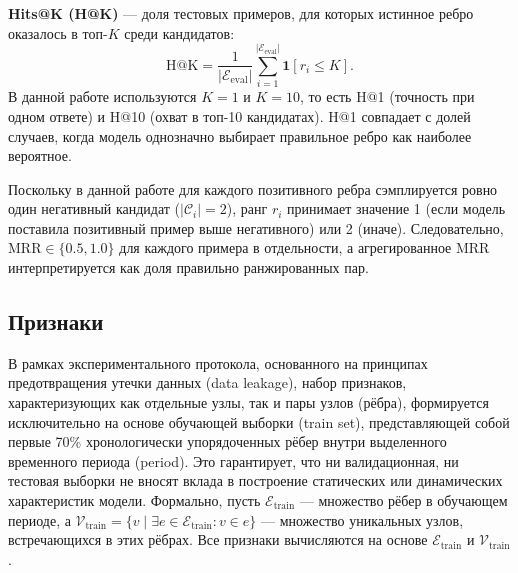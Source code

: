 \documentclass[a4paper,12pt]{extarticle}
\begin{document}
\textbf{Hits@K (H@K)} — доля тестовых примеров, для которых истинное ребро оказалось в топ-$K$ среди кандидатов:
\[
\text{H@K} = \frac{1}{|\mathcal{E}_{\text{eval}}|} \sum_{i=1}^{|\mathcal{E}_{\text{eval}}|} \mathbf{1}[r_i \leq K].
\]
В данной работе используются $K = 1$ и $K = 10$, то есть H@1 (точность при одном ответе) и H@10 (охват в топ-10 кандидатах). H@1 совпадает с долей случаев, когда модель однозначно выбирает правильное ребро как наиболее вероятное.

Поскольку в данной работе для каждого позитивного ребра сэмплируется ровно один негативный кандидат ($|\mathcal{C}_i| = 2$), ранг $r_i$ принимает значение 1 (если модель поставила позитивный пример выше негативного) или 2 (иначе). Следовательно, $\text{MRR} \in \{0.5, 1.0\}$ для каждого примера в отдельности, а агрегированное MRR интерпретируется как доля правильно ранжированных пар.

\subsection{Признаки}

В рамках экспериментального протокола, основанного на принципах предотвращения утечки данных (data leakage), набор признаков, характеризующих как отдельные узлы, так и пары узлов (рёбра), формируется исключительно на основе обучающей выборки (train set), представляющей собой первые 70\% хронологически упорядоченных рёбер внутри выделенного временного периода (period). Это гарантирует, что ни валидационная, ни тестовая выборки не вносят вклада в построение статических или динамических характеристик модели. Формально, пусть $\mathcal{E}_{\text{train}}$ — множество рёбер в обучающем периоде, а $\mathcal{V}_{\text{train}} = \{v \mid \exists e \in \mathcal{E}_{\text{train}}: v \in e\}$ — множество уникальных узлов, встречающихся в этих рёбрах. Все признаки вычисляются на основе $\mathcal{E}_{\text{train}}$ и $\mathcal{V}_{\text{train}}$.
\end{document}
